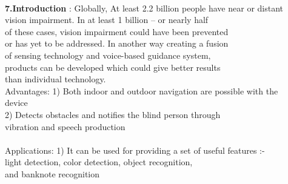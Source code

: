 \documentclass[12pt]{article}
\begin{document}
\begin{tabbing}
		\\
		\textbf{7.Introduction}\>  :  Globally, At least 2.2 billion people have near or distant\\ \hspace{5.4cm} vision impairment. In at least 1 billion – or nearly half\\ \hspace{5.4cm} of these cases, vision impairment could have been prevented\\ \hspace{5.4cm} or has yet to be addressed. In another way creating a fusion\\ \hspace{5.4cm} of sensing technology and voice-based guidance system,\\ \hspace{5.4cm} products can be developed which could give better results\\ \hspace{5.4cm}  than individual technology.                \\
		
		Advantages: \hspace{2.9cm} 1) Both indoor and outdoor navigation are possible with the\\ \hspace{5.8cm} device \\ \hspace{5.5cm}2) Detects obstacles and notifies the blind person through\\ \hspace{5.9cm} vibration and speech production \\ 
		
		\\
		
		
		Applications: \hspace{2.7cm} 1) It can be used for providing a set of useful features :-\\ \hspace{5.8cm}  light detection, color detection, object recognition,\\ \hspace{5.8cm} and banknote recognition
		
		\\
		
		\\
		
		
		
		
		

\end{tabbing}
\end{document}
